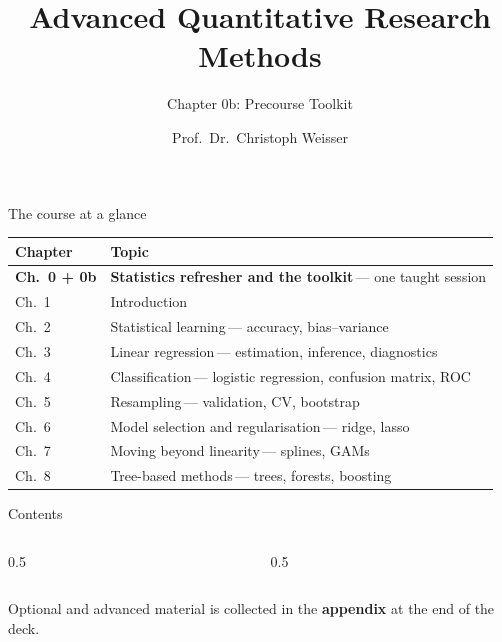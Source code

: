 \documentclass[aspectratio=169,11pt]{beamer}
\title{Advanced Quantitative Research Methods}
\subtitle{Chapter 0b: Precourse Toolkit}
\author{Prof.\ Dr.\ Christoph Weisser}
\date{}\graphicspath{{images/}}
\begin{document}
\begin{frame}[plain]\titlepage\end{frame}

\begin{frame}{The course at a glance}
  \vspace{-1.5mm}
  \begin{center}
  \scriptsize
  \setlength{\tabcolsep}{5pt}
  \renewcommand{\arraystretch}{1.30}
  \begin{tabular}{@{\hspace{2pt}}l >{\raggedright\arraybackslash}p{}@{\hspace{2pt}}}
    \toprule
    \textbf{Chapter} & \textbf{Topic} \\
    \midrule
    \rowcolor{accent!18} \textbf{Ch.\ 0 + 0b} & \textbf{Statistics refresher and the toolkit}\,{\color{accent!75!black}--- one taught session} \\
    \rowcolor{black!3} {\color{accent}Ch.\ 1} & Introduction \\
     {\color{accent}Ch.\ 2} & Statistical learning\,{\color{black!45}--- accuracy, bias--variance} \\
    \rowcolor{black!3} {\color{accent}Ch.\ 3} & Linear regression\,{\color{black!45}--- estimation, inference, diagnostics} \\
     {\color{accent}Ch.\ 4} & Classification\,{\color{black!45}--- logistic regression, confusion matrix, ROC} \\
    \rowcolor{black!3} {\color{accent}Ch.\ 5} & Resampling\,{\color{black!45}--- validation, CV, bootstrap} \\
     {\color{accent}Ch.\ 6} & Model selection and regularisation\,{\color{black!45}--- ridge, lasso} \\
    \rowcolor{black!3} {\color{accent}Ch.\ 7} & Moving beyond linearity\,{\color{black!45}--- splines, GAMs} \\
     {\color{accent}Ch.\ 8} & Tree-based methods\,{\color{black!45}--- trees, forests, boosting} \\
    \bottomrule
  \end{tabular}
  \end{center}
\end{frame}

\begin{frame}{Contents}
  \begin{columns}[t]
    \begin{column}{0.5\textwidth}
      \tableofcontents[hideallsubsections,sections={1-4}]
    \end{column}
    \begin{column}{0.5\textwidth}
      \tableofcontents[hideallsubsections,sections={5-7}]
    \end{column}
  \end{columns}
  \vfill
  {\tiny Optional and advanced material is collected in the \textbf{appendix} at the end of the deck.}
\end{frame}
\end{document}
